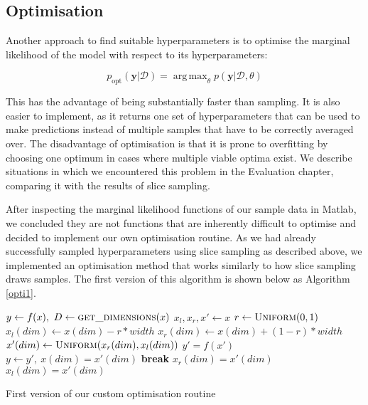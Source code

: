 \documentclass[a4paper,12pt,twoside,openright]{report}
\newcommand{\Break}{\State \textbf{break} }
\DeclareMathOperator*{\argmax}{arg\,max}
\begin{document}
\subsection{Optimisation}
Another approach to find suitable hyperparameters is to optimise the marginal likelihood of the model with respect to its hyperparameters:

\begin{equation}
p_{\text{opt}}(\mathbf{y}|\mathcal{D}) = \argmax_\theta p(\mathbf{y}|\mathcal{D}, \theta)
\end{equation}


This has the advantage of being substantially faster than sampling. It is also easier to implement, as it returns one set of hyperparameters that can be used to make predictions instead of multiple samples that have to be correctly averaged over. The disadvantage of optimisation is that it is prone to overfitting by choosing one optimum in cases where multiple viable optima exist. We describe situations in which we encountered this problem in the Evaluation chapter, comparing it with the results of slice sampling.

After inspecting the marginal likelihood functions of our sample data in Matlab, we concluded they are not functions that are inherently difficult to optimise and decided to implement our own optimisation routine. As we had already successfully sampled hyperparameters using slice sampling as described above, we implemented an optimisation method that works similarly to how slice sampling draws samples. The first version of this algorithm is shown below as Algorithm \ref{opti1}.


\begin{algorithm}
\begin{algorithmic}[1]
\State $y\gets f(x),\ D\gets \Call{get\_dimensions}{x}$
\State $x_l, x_r, x'\gets x$
\State $r\gets \Call{Uniform}{0, 1}$
\State $x_l(dim)\gets x(dim) - r * width$
\State $x_r(dim)\gets x(dim) + (1 - r) * width$
\State $x'(dim)\gets \Call{Uniform}{x_r(dim), x_l(dim)}$
\State $y' = f(x')$
\State $y\gets y',\ x(dim) = x'(dim)$
\Break
\EndIf
{}
\State $x_r(dim) = x'(dim)$
\State $x_l(dim) = x'(dim)$
\EndIf
\EndFor
\EndFor
\EndFor
\EndProcedure
\end{algorithmic}
\caption{First version of our custom optimisation routine}
\label{opti1}
\end{algorithm}
\end{document}
